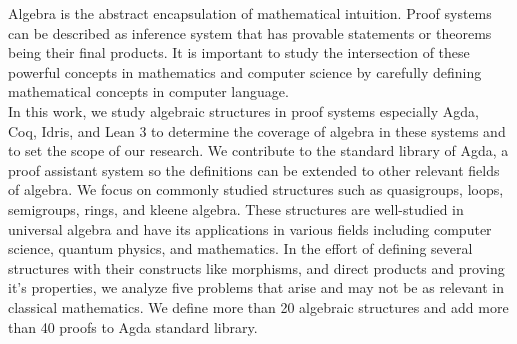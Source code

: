 Algebra is the abstract encapsulation of mathematical intuition. Proof systems can be described as inference system that has provable statements or theorems being their final products. It is important to study the intersection of these powerful concepts in mathematics and computer science by carefully defining mathematical concepts in computer language.\\

In this work, we study algebraic structures in proof systems especially Agda, Coq, Idris, and Lean 3 to determine the coverage of algebra in these systems and to set the scope of our research. We contribute to the standard library of Agda, a proof assistant system so the definitions can be extended to other relevant fields of algebra. We focus on commonly studied structures such as quasigroups, loops, semigroups, rings, and kleene algebra. These structures are well-studied in universal algebra and have its applications in various fields including computer science, quantum physics, and mathematics. In the effort of defining several structures with their constructs like morphisms, and direct products and proving it's properties, we analyze five problems that arise and may not be as relevant in classical mathematics. We define more than 20 algebraic structures and add more than 40 proofs to Agda standard library.